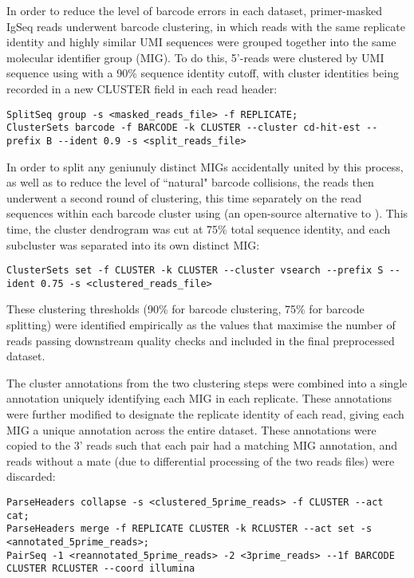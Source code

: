 {In order to reduce the level of barcode errors in each dataset, primer-masked IgSeq reads underwent barcode clustering, in which reads with the same replicate identity and highly similar UMI sequences were grouped together into the same molecular identifier group (MIG). To do this, 5'-reads were clustered by UMI sequence using   \parencite{li2006cdhit,fu2012cdhit} with a 90\% sequence identity cutoff, with cluster identities being recorded in a new CLUSTER field in each read header:

\begin{lstlisting}
SplitSeq group -s <masked_reads_file> -f REPLICATE;
ClusterSets barcode -f BARCODE -k CLUSTER --cluster cd-hit-est --prefix B --ident 0.9 -s <split_reads_file>
\end{lstlisting}

In order to split any geniunuly distinct MIGs accidentally united by this process, as well as to reduce the level of ``natural" barcode collisions, the reads then underwent a second round of clustering, this time separately on the read sequences within each barcode cluster using  (an open-source alternative to  \parencite{edgar2010usearch,rognes2016vsearch}).
This time, the cluster dendrogram was cut at 75\% total sequence identity, and each subcluster was separated into its own distinct MIG:

\begin{lstlisting}
ClusterSets set -f CLUSTER -k CLUSTER --cluster vsearch --prefix S --ident 0.75 -s <clustered_reads_file>
\end{lstlisting}

These clustering thresholds (90\% for barcode clustering, 75\% for barcode splitting) were identified empirically as the values that maximise the number of reads passing downstream quality checks and included in the final preprocessed dataset.

The cluster annotations from the two clustering steps were combined into a single annotation uniquely identifying each MIG in each replicate. These annotations were further modified to designate the replicate identity of each read, giving each MIG a unique annotation across the entire dataset. These annotations were copied to the 3' reads such that each pair had a matching MIG annotation, and reads without a mate (due to differential processing of the two reads files) were discarded:

\begin{lstlisting}
ParseHeaders collapse -s <clustered_5prime_reads> -f CLUSTER --act cat;
ParseHeaders merge -f REPLICATE CLUSTER -k RCLUSTER --act set -s <annotated_5prime_reads>;
PairSeq -1 <reannotated_5prime_reads> -2 <3prime_reads> --1f BARCODE CLUSTER RCLUSTER --coord illumina
\end{lstlisting}

}
